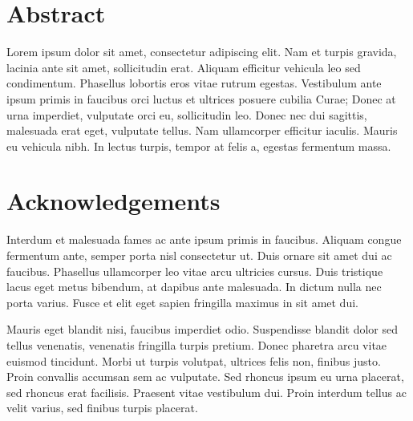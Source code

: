 \documentclass[12pt,a4paper,]{report}
\begin{document}
\hypertarget{abstract}{%
\chapter*{Abstract}\label{abstract}}

Lorem ipsum dolor sit amet, consectetur adipiscing elit. Nam et turpis
gravida, lacinia ante sit amet, sollicitudin erat. Aliquam efficitur
vehicula leo sed condimentum. Phasellus lobortis eros vitae rutrum
egestas. Vestibulum ante ipsum primis in faucibus orci luctus et
ultrices posuere cubilia Curae; Donec at urna imperdiet, vulputate orci
eu, sollicitudin leo. Donec nec dui sagittis, malesuada erat eget,
vulputate tellus. Nam ullamcorper efficitur iaculis. Mauris eu vehicula
nibh. In lectus turpis, tempor at felis a, egestas fermentum massa.

\setcounter{page}{1}

\hypertarget{acknowledgements}{%
\chapter*{Acknowledgements}\label{acknowledgements}}

Interdum et malesuada fames ac ante ipsum primis in faucibus. Aliquam
congue fermentum ante, semper porta nisl consectetur ut. Duis ornare sit
amet dui ac faucibus. Phasellus ullamcorper leo vitae arcu ultricies
cursus. Duis tristique lacus eget metus bibendum, at dapibus ante
malesuada. In dictum nulla nec porta varius. Fusce et elit eget sapien
fringilla maximus in sit amet dui.

Mauris eget blandit nisi, faucibus imperdiet odio. Suspendisse blandit
dolor sed tellus venenatis, venenatis fringilla turpis pretium. Donec
pharetra arcu vitae euismod tincidunt. Morbi ut turpis volutpat,
ultrices felis non, finibus justo. Proin convallis accumsan sem ac
vulputate. Sed rhoncus ipsum eu urna placerat, sed rhoncus erat
facilisis. Praesent vitae vestibulum dui. Proin interdum tellus ac velit
varius, sed finibus turpis placerat.

\newpage


\tableofcontents

\newpage

\listoffigures

\newpage

\listoftables
\end{document}

